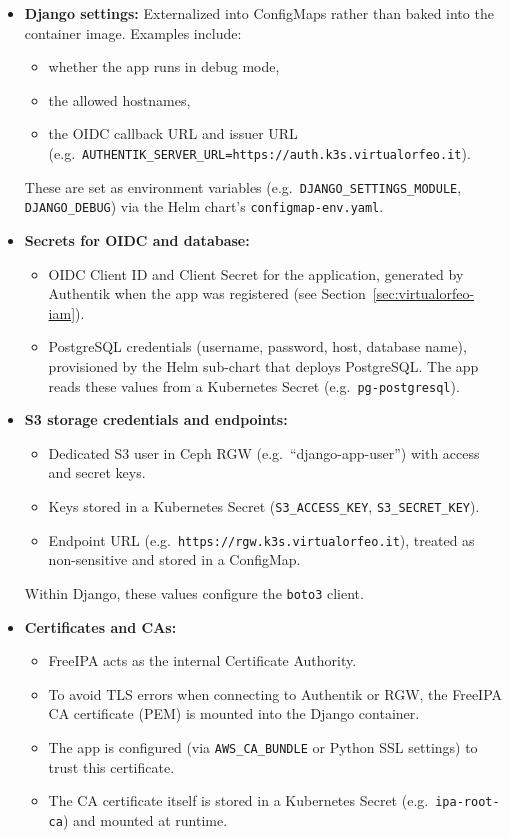 \begin{itemize}
	\item \textbf{Django settings:}  
	Externalized into ConfigMaps rather than baked into the container image.  
	Examples include:  
	\begin{itemize}
		\item whether the app runs in debug mode,  
		\item the allowed hostnames,  
		\item the OIDC callback URL and issuer URL (e.g.\ \texttt{AUTHENTIK\_SERVER\_URL=https://auth.k3s.virtualorfeo.it}).  
	\end{itemize}  
	These are set as environment variables (e.g.\ \texttt{DJANGO\_SETTINGS\_MODULE}, \texttt{DJANGO\_DEBUG}) via the Helm chart’s \texttt{configmap-env.yaml}.
	
	\item \textbf{Secrets for OIDC and database:}  
	\begin{itemize}
		\item OIDC Client ID and Client Secret for the application, generated by Authentik when the app was registered (see Section~\ref{sec:virtualorfeo-iam}).  
		\item PostgreSQL credentials (username, password, host, database name), provisioned by the Helm sub-chart that deploys PostgreSQL. The app reads these values from a Kubernetes Secret (e.g.\ \texttt{pg-postgresql}).  
	\end{itemize}  
	
	\item \textbf{S3 storage credentials and endpoints:}  
	\begin{itemize}
		\item Dedicated S3 user in Ceph RGW (e.g.\ ``django-app-user'') with access and secret keys.  
		\item Keys stored in a Kubernetes Secret (\texttt{S3\_ACCESS\_KEY}, \texttt{S3\_SECRET\_KEY}).  
		\item Endpoint URL (e.g.\ \texttt{https://rgw.k3s.virtualorfeo.it}), treated as non-sensitive and stored in a ConfigMap.  
	\end{itemize}  
	Within Django, these values configure the \texttt{boto3} client.  
	
	\item \textbf{Certificates and CAs:}  
	\begin{itemize}
		\item FreeIPA acts as the internal Certificate Authority.  
		\item To avoid TLS errors when connecting to Authentik or RGW, the FreeIPA CA certificate (PEM) is mounted into the Django container.  
		\item The app is configured (via \texttt{AWS\_CA\_BUNDLE} or Python SSL settings) to trust this certificate.  
		\item The CA certificate itself is stored in a Kubernetes Secret (e.g.\ \texttt{ipa-root-ca}) and mounted at runtime.  
	\end{itemize}  
	

\end{itemize}
